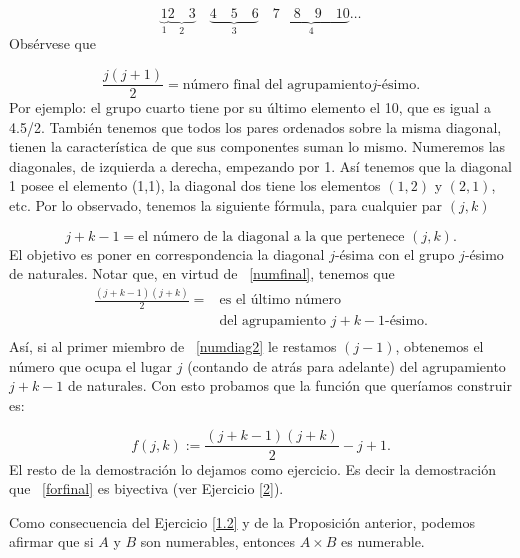 \begin{demo}
\[\underbrace{1}_{1} \underbrace{2\quad 3}_{2}\quad\underbrace{4\quad 5\quad
6}_{3}\quad \underbrace{7\quad 8\quad  9\quad 10}_{4}\dots
\]
Obsérvese que

\begin{equation}\label{numfinal}
\frac{j(j +1)}{2}=\text{número final del agrupamiento
$j$-ésimo}.
\end{equation}
Por ejemplo: el grupo cuarto tiene por su último elemento el 10,
que es igual a 4.5/2. También tenemos que todos los pares
ordenados sobre la misma diagonal, tienen la característica
de que sus componentes suman lo mismo. Numeremos las diagonales,
de izquierda a derecha, empezando por 1. Así tenemos que la
diagonal 1 posee el elemento (1,1), la diagonal dos tiene los
elementos $(1,2)$ y $(2,1)$, etc. Por lo observado, tenemos la
siguiente fórmula, para cualquier par $(j,k)$

\begin{equation}\label{numdiag}
j+k-1=\text{el número de la diagonal a la que pertenece } (j,k).
\end{equation}
 El objetivo es poner en correspondencia la diagonal
$j$-ésima con el grupo $j$-ésimo de naturales. Notar que, en
virtud de ~\eqref{numfinal}, tenemos que
\begin{equation}\label{numdiag2}
\begin{split}
\frac{(j+k-1)(j+k)}{2}=&\text{es el último número}\\
                       &\text{del agrupamiento $j+k-1$-ésimo}.\\
\end{split}
\end{equation}
Así, si al primer miembro de ~\eqref{numdiag2} le restamos
$(j-1)$, obtenemos el número que ocupa el lugar $j$ (contando de
atrás para adelante) del agrupamiento $j+k-1$ de naturales. Con
esto probamos que la función que queríamos construir es:

\begin{equation}\label{forfinal}
f(j,k):=\frac{(j+k-1)(j+k)}{2}-j+1.
\end{equation}
El resto de la demostración lo dejamos como ejercicio. Es decir la   demostración que ~\eqref{forfinal} es
biyectiva (ver Ejercicio \vref{2}).
\end{demo}

Como consecuencia del Ejercicio \vref{1.2} y de la Proposición
anterior, podemos afirmar que si $A$ y $B$ son numerables,
entonces $A\times B$ es numerable.



